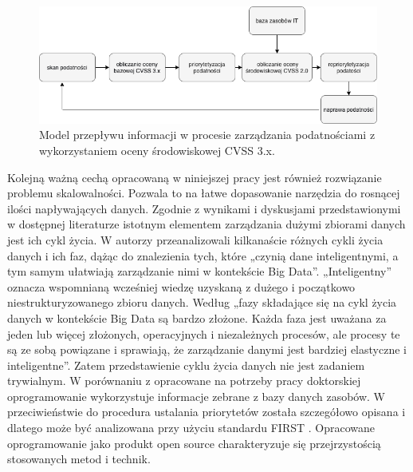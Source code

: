 \begin{figure}[!ht]
\centering
\includegraphics[width=.9\textwidth]{Chapters/Wstep/vm-models/vm-model-cvss-e-3.png}
\caption{Model przepływu informacji w procesie zarządzania podatnościami z wykorzystaniem oceny środowiskowej CVSS 3.x.}
\label{fig:chapter1:vm-model-cvss3e}
\end{figure}

\bigbreak
Kolejną ważną cechą opracowaną w niniejszej pracy jest również rozwiązanie problemu skalowalności. Pozwala to na łatwe dopasowanie narzędzia do rosnącej ilości napływających danych. Zgodnie z wynikami i dyskusjami przedstawionymi w dostępnej literaturze istotnym elementem zarządzania dużymi zbiorami danych jest ich cykl życia. W \cite{el2017data} autorzy przeanalizowali kilkanaście różnych cykli życia danych i ich faz, dążąc do znalezienia tych, które „czynią dane inteligentnymi, a tym samym ułatwiają zarządzanie nimi w kontekście Big Data”. „Inteligentny” oznacza wspomnianą wcześniej wiedzę uzyskaną z dużego i początkowo niestrukturyzowanego zbioru danych. Według \cite{lenk2015towards} „fazy składające się na cykl życia danych w kontekście Big Data są bardzo złożone. Każda faza jest uważana za jeden lub więcej złożonych, operacyjnych i niezależnych procesów, ale procesy te są ze sobą powiązane i sprawiają, że zarządzanie danymi jest bardziej elastyczne i inteligentne”. Zatem przedstawienie cyklu życia danych nie jest zadaniem trywialnym. W porównaniu z \cite{yadav2019patchrank, miura2007securerank, farris2018vulcon, chen2019vest} opracowane na potrzeby pracy doktorskiej oprogramowanie wykorzystuje informacje zebrane z bazy danych zasobów. W przeciwieństwie do \cite{fsecure2021, qualys2021, rapid72021, tenablevm2021} procedura ustalania priorytetów została szczegółowo opisana i dlatego może być analizowana przy użyciu standardu FIRST \cite{cvs2005specification, cvs2019specification}. Opracowane oprogramowanie jako produkt open source \cite{vmcgithub} charakteryzuje się przejrzystością stosowanych metod i technik.

\FloatBarrier

